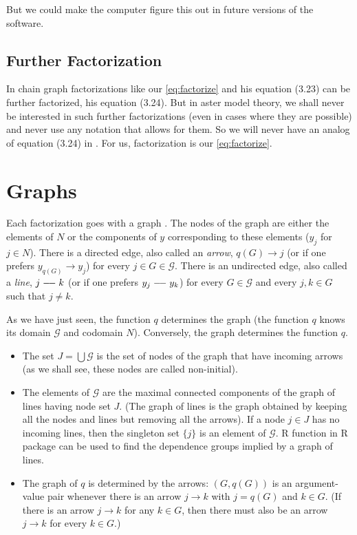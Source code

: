 But we could make the computer figure this out in future versions of the
software.

\subsection{Further Factorization}
\label{sec:further-factorize}

In \citet{lauritzen} chain graph factorizations like our \eqref{eq:factorize}
and his equation (3.23) can be further factorized, his equation (3.24).
But in aster model theory, we shall never be interested in such further
factorizations (even in cases where they are possible) and never use any
notation that allows for them.  So we will never have an analog of equation
(3.24) in \citet{lauritzen}.  For us, factorization is our \eqref{eq:factorize}.

\section{Graphs}

Each factorization goes with a graph \citep[Section~3.2.3]{lauritzen}.
The nodes of the graph are either the elements of $N$ or the components
of $y$ corresponding to these elements ($y_j$ for $j \in N$).
There is a directed edge, also called an \emph{arrow},
$q(G) \longrightarrow j$ (or if one prefers $y_{q(G)} \longrightarrow y_j$)
for every $j \in G \in \mathcal{G}$.
There is an undirected edge, also called a \emph{line},
$j \myline k$ (or if one prefers $y_j \myline y_k$)
for every $G \in \mathcal{G}$ and every $j, k \in G$ such that $j \neq k$.

As we have just seen, the function $q$ determines the graph
(the function $q$ knows its domain $\mathcal{G}$ and codomain $N$).
Conversely, the graph determines the function $q$.
\begin{itemize}
\item The set $J = \bigcup \mathcal{G}$ is the set of nodes of the graph
    that have incoming arrows (as we shall see, these nodes are called
    non-initial).
\item The elements of $\mathcal{G}$ are the maximal connected components
    of the graph of lines having node set $J$.
    (The graph of lines is the graph obtained by keeping all the nodes
    and lines but removing all the arrows).
    If a node $j \in J$ has no incoming lines, then the singleton set $\{j\}$
    is an element of $\mathcal{G}$.
    R function  in R package  \citep{pooh-package}
    can be used to find the dependence groups implied by a graph of lines.
\item The graph of $q$ is determined by the arrows: $(G, q(G))$ is an
    argument-value pair whenever there is an arrow $j \longrightarrow k$
    with $j = q(G)$ and $k \in G$.
    (If there is an arrow $j \longrightarrow k$ for any $k \in G$,
    then there must also be an arrow $j \longrightarrow k$
    for every $k \in G$.)

\end{itemize}

